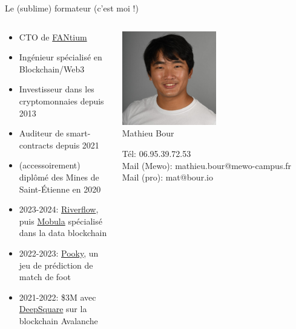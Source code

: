 \begin{frame}{Le (sublime) formateur (c'est moi !)}
  \begin{columns}
    \begin{column}{0.5\textwidth}
      \begin{itemize}
        \item CTO de \href{https://fantium.co}{FANtium}
        \item Ingénieur spécialisé en Blockchain/Web3
        \item Investisseur dans les cryptomonnaies depuis 2013
        \item Auditeur de smart-contracts depuis 2021
        \item (accessoirement) diplômé des Mines de Saint-Étienne en 2020
        \item 2023-2024: \href{https://riverflow.co}{Riverflow}, puis \href{https://mobula.io}{Mobula} spécialisé dans la data blockchain
        \item 2022-2023: \href{https://pooky.gg}{Pooky}, un jeu de prédiction de match de foot
        \item 2021-2022: \$3M avec \href{https://deepsquare.io}{DeepSquare} sur la blockchain Avalanche
      \end{itemize}
    \end{column}

    \begin{column}{0.5\textwidth}
      \begin{center}
        \includegraphics[width=0.5\textwidth]{img/mathieu.jpg} \\
        Mathieu Bour

        Tél: 06.95.39.72.53 \\
        Mail (Mewo): mathieu.bour@mewo-campus.fr \\
        Mail (pro): mat@bour.io
      \end{center}
    \end{column}
  \end{columns}
\end{frame}